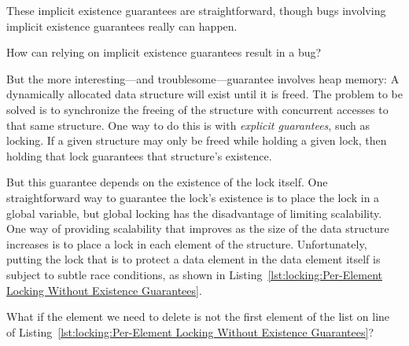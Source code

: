 These implicit existence guarantees are straightforward, though
bugs involving implicit existence guarantees really can happen.

\QuickQuiz{}
	How can relying on implicit existence guarantees result in
	a bug?
 \QuickQuizEnd

But the more interesting---and troublesome---guarantee involves
heap memory: A dynamically allocated data structure will exist until it
is freed.
The problem to be solved is to synchronize the freeing of the structure
with concurrent accesses to that same structure.
One way to do this is with \emph{explicit guarantees}, such as locking.
If a given structure may only be freed while holding a given lock, then holding
that lock guarantees that structure's existence.

But this guarantee depends on the existence of the lock itself.
One straightforward way to guarantee the lock's existence is to
place the lock in a global variable, but global locking has the disadvantage
of limiting scalability.
One way of providing scalability that improves as the size of the
data structure increases is to place a lock in each element of the
structure.
Unfortunately, putting the lock that is to protect a data element
in the data element itself is subject to subtle race conditions,
as shown in
Listing~\ref{lst:locking:Per-Element Locking Without Existence Guarantees}.

\QuickQuiz{}
	\begin{lineref}
	What if the element we need to delete is not the first element
	of the list on line~ of
	Listing~\ref{lst:locking:Per-Element Locking Without Existence Guarantees}?
        \end{lineref}
 \QuickQuizEnd

